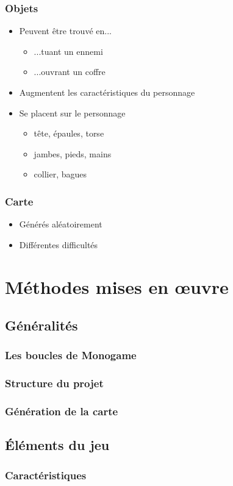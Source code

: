 \documentclass{beamer}
\begin{document}
\begin{frame}
\frametitle{Objets}
\begin{itemize}
	\item Peuvent être trouvé en...
	\begin{itemize}
		\item ...tuant un ennemi
		\item ...ouvrant un coffre
	\end{itemize}
	\item Augmentent les caractéristiques du personnage
	\item Se placent sur le personnage
	\begin{itemize}
		\item tête, épaules, torse
		\item jambes, pieds, mains
		\item collier, bagues
	\end{itemize}
\end{itemize}
\end{frame}

\begin{frame}
\frametitle{Carte}
\begin{itemize}
	\item Générés aléatoirement
	\item Différentes difficultés
\end{itemize}
\end{frame}


\section{Méthodes mises en œuvre}
\subsection{Généralités}
\begin{frame}
\frametitle{Les boucles de Monogame}
\end{frame}

\begin{frame}
\frametitle{Structure du projet}
\end{frame}

\begin{frame}
\frametitle{Génération de la carte}
\end{frame}

\subsection{Éléments du jeu}
\begin{frame}
\frametitle{Caractéristiques}
\end{frame}
\end{document}
